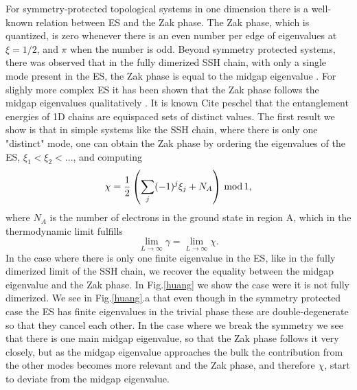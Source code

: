 \documentclass[twocolumn,amsmath,longbibliography,amssymb,superscriptaddress]{revtex4-1}
\newcommand{\carlos}[1]{{\color{red} #1}}
\begin{document}
For symmetry-protected topological systems in one dimension there is a well-known relation between ES and the Zak phase. The Zak phase, which is quantized, is zero whenever there is an even number per edge of eigenvalues at $\xi = 1/2$, and $\pi$ when the number is odd. Beyond symmetry protected systems, there was observed that in the fully dimerized SSH chain, with only a single mode present in the ES, the Zak phase is equal to the midgap eigenvalue \cite{Ryu2006}. For slighly more complex ES it has been shown that the Zak phase follows the midgap eigenvalues qualitatively \cite{Huang2012,Huang2012-2}. It is known \carlos{Cite peschel} that the entanglement energies of 1D chains are equispaced sets of distinct values. The first result we show is that in simple systems like the SSH chain, where there is only one "distinct" mode, one can obtain the Zak phase by ordering the eigenvalues of the ES, $\xi_1 < \xi_2 < ...$, and computing
\begin{equation}
\chi = \frac{1}{2}\left(\sum_j (-1)^j \xi_j+N_A\right) \, {\rm mod} \, 1,
\label{eqplusminus}
\end{equation}
where $N_A$ is the number of electrons in the ground state in region A, which in the thermodynamic limit fulfills
\begin{equation}
\lim_{L \rightarrow \infty} \gamma = \lim_{L \rightarrow \infty} \chi.
\end{equation}
In the case where there is only one finite eigenvalue in  the ES, like in the fully dimerized limit of the SSH chain, we recover the equality between the midgap eigenvalue and the Zak phase. In Fig.\ref{huang} we show the case were it is not fully dimerized. We see in Fig.\ref{huang}.a that even though in the symmetry protected case the ES has finite eigenvalues in the trivial phase these are double-degenerate so that they cancel each other. In the case where we break the symmetry we see that there is one main midgap eigenvalue, so that the Zak phase follows it very closely, but as the midgap eigenvalue approaches the bulk the contribution from the other modes becomes more relevant and the Zak phase, and therefore $\chi$, start to deviate from the midgap eigenvalue.
\end{document}
